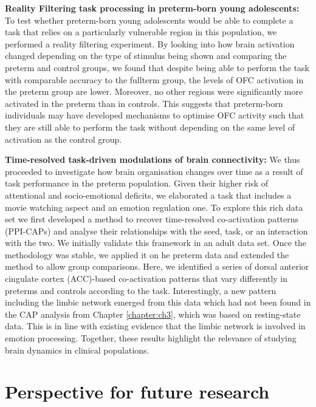 \textbf{Reality Filtering task processing in preterm-born young adolescents:} To test whether pre\-term-born young adolescents would be able to complete a task that relies on a particularly vulnerable region in this population, we performed a reality filtering experiment. By looking into how brain activation changed depending on the type of stimulus being shown and comparing the preterm and control groups, we found that despite being able to perform the task with comparable accuracy to the fullterm group, the levels of OFC activation in the preterm group are lower. Moreover, no other regions were significantly more activated in the preterm than in controls. This suggests that preterm-born individuals may have developed mechanisms to optimise OFC activity such that they are still able to perform the task without depending on the same level of activation as the control group.





\textbf{Time-resolved task-driven modulations of brain connectivity:}
We thus proceeded to investigate how brain organisation changes over time as a result of task performance in the preterm population. Given their higher risk of attentional and socio-emotional deficits, we elaborated a task that includes a movie watching aspect and an emotion regulation one. To explore this rich data set we first developed a method to recover time-resolved co-activation patterns (PPI-CAPs) and analyse their relationships with the seed, task, or an interaction with the two. We initially validate this framework in an adult data set. Once the methodology was stable, we applied it on he preterm data and extended the method to allow group comparisons. Here, we identified a series of dorsal anterior cingulate cortex (ACC)-based co-activation patterns that vary differently in preterms and controls according to the task. Interestingly, a new pattern including the limbic network emerged from this data which had not been found in the CAP analysis from Chapter \ref{chapter:ch3}, which was based on resting-state data. This is in line with existing evidence that the limbic network is involved in emotion processing. Together, these results highlight the relevance of studying brain dynamics in clinical populations. 









\section{Perspective for future research}


